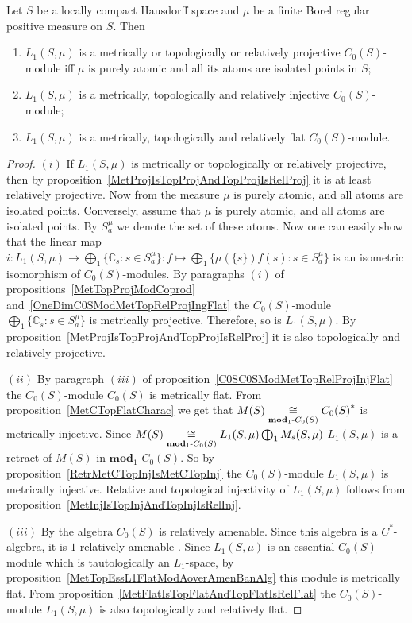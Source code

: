 \begin{proposition}\label{L1C0SModMetTopRelProjInjFlat} Let $S$ be a locally
compact Hausdorff space and $\mu$ be a finite Borel regular positive measure on
$S$. Then 

\begin{enumerate}[label = (\roman*)]
    \item $L_1(S,\mu)$ is a metrically or topologically or relatively projective 
    $C_0(S)$-module iff $\mu$ is purely atomic and all its atoms are 
    isolated points in $S$;

    \item $L_1(S,\mu)$ is a metrically, topologically and relatively injective 
    $C_0(S)$-module;

    \item $L_1(S,\mu)$ is a metrically, topologically and relatively flat
    $C_0(S)$-module.
\end{enumerate}
\end{proposition}
\begin{proof} $(i)$ If $L_1(S,\mu)$ is metrically or topologically or relatively
projective, then by proposition~\ref{MetProjIsTopProjAndTopProjIsRelProj} it is
at least relatively projective. Now from \cite[theorem 2]{NemRelProjModLp} 
the measure $\mu$ is purely atomic, and all atoms are isolated  points.
Conversely, assume that $\mu$ is purely atomic, and all atoms are isolated
points. By $S_a^{\mu}$ we denote the set of these atoms. Now one can easily show
that the linear map 
$i:L_1(S,\mu)\to\bigoplus_1 \{\mathbb{C}_s:s\in S_a^{\mu} \}
:f\mapsto \bigoplus_1 \{\mu( \{s \})f(s):s\in S_a^{\mu} \}$ is an isometric
isomorphism of $C_0(S)$-modules. By paragraphs $(i)$ of
propositions~\ref{MetTopProjModCoprod}
and~\ref{OneDimC0SModMetTopRelProjIngFlat} the $C_0(S)$-module $\bigoplus_1
\{\mathbb{C}_s:s\in S_a^{\mu} \}$ is metrically projective. Therefore, so is
$L_1(S,\mu)$. By proposition~\ref{MetProjIsTopProjAndTopProjIsRelProj} it is
also topologically and relatively projective.

$(ii)$ By paragraph $(iii)$ of proposition~\ref{C0SC0SModMetTopRelProjInjFlat} 
the $C_0(S)$-module $C_0(S)$ is metrically flat. From
proposition~\ref{MetCTopFlatCharac} we get that
$M(S)\mathrel{\mathop{\cong}\limits_{\mathbf{mod}_1\text{-}C_0(S)}}{C_0(S)}^*$ is metrically injective. Since
$M(S)\mathrel{\mathop{\cong}\limits_{\mathbf{mod}_1\text{-}C_0(S)}}L_1(S,\mu)\bigoplus_1 M_s(S,\mu)$
$L_1(S,\mu)$ is a retract of $M(S)$ in $\mathbf{mod}_1\text{-}C_0(S)$. So by
proposition~\ref{RetrMetCTopInjIsMetCTopInj} the $C_0(S)$-module $L_1(S,\mu)$ is
metrically injective. Relative and topological injectivity of $L_1(S,\mu)$
follows from proposition~\ref{MetInjIsTopInjAndTopInjIsRelInj}.

$(iii)$ By \cite[theorem 7.1.87]{HelBanLocConvAlg} the algebra $C_0(S)$ is
relatively amenable. Since this algebra is a $C^*$-algebra, it is $1$-relatively 
amenable \cite[example 2]{RundeAmenConstFour}. Since $L_1(S,\mu)$ is 
an essential $C_0(S)$-module which is tautologically an $L_1$-space, by
proposition~\ref{MetTopEssL1FlatModAoverAmenBanAlg} this module is metrically
flat. From proposition~\ref{MetFlatIsTopFlatAndTopFlatIsRelFlat} the
$C_0(S)$-module $L_1(S,\mu)$ is also topologically and relatively flat.
\end{proof}

